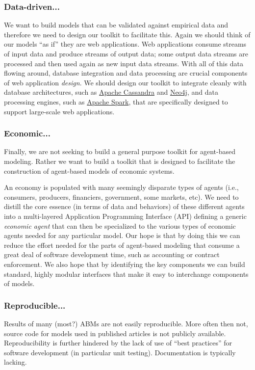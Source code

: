 \documentclass[11pt]{amsart}
\begin{document}
\subsubsection{Data-driven...}
We want to build models that can be validated against empirical data and therefore we need to design our toolkit to facilitate this.  Again we should think of our models ``as if'' they are web applications. Web applications consume streams of input data and produce streams of output data; some output data streams are processed and then used again as new input data streams. With all of this data flowing around, database integration and data processing are crucial components of web application \textit{design}. We should design our toolkit to integrate cleanly with database architectures, such as \href{http://cassandra.apache.org/}{Apache Cassandra} and \href{http://neo4j.com/}{Neo4j}, and data processing engines, such as \href{http://spark.apache.org/}{Apache Spark}, that are specifically designed to support large-scale web applications.

\subsubsection{Economic...}
Finally, we are not seeking to build a general purpose toolkit for agent-based modeling. Rather we want to build a toolkit that is designed to facilitate the construction of agent-based models of economic systems.

An economy is populated with many seemingly disparate types of agents (i.e., consumers, producers, financiers, government, some markets, etc). We need to distill the core essence (in terms of data and behaviors) of these different agents into a multi-layered Application Programming Interface (API) defining a generic \textit{economic agent} that can then be specialized to the various types of economic agents needed for any particular model. Our hope is that by doing this we can reduce the effort needed for the parts of agent-based modeling that consume a great deal of software development time, such as accounting or contract enforcement.  We also hope that by identifying the key components we can build standard, highly modular interfaces that make it easy to interchange components of models.

\subsubsection{Reproducible...}
Results of many (most?) ABMs are not easily reproducible. More often then not, source code for models used in published articles is not publicly available. Reproducibility is further hindered by the lack of use of ``best practices'' for software development (in particular unit testing). Documentation is typically lacking. 
\end{document}
